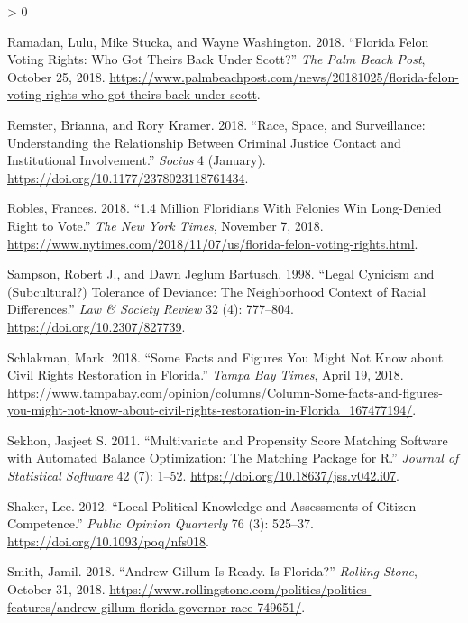 \documentclass[
  12pt,
]{article}
\newlength{\cslhangindent}
\newenvironment{CSLReferences}[2] %
 {%
  \setlength{\parindent}{0pt}
  \ifodd #1 \everypar{\setlength{\hangindent}{\cslhangindent}}\ignorespaces\fi
  \ifnum #2 > 0
  \setlength{\parskip}{#2\baselineskip}
  \fi
 }%
 {}
\begin{document}
\begin{CSLReferences}{1}{0}
\leavevmode\hypertarget{ref-Ramadan2018}{}%
Ramadan, Lulu, Mike Stucka, and Wayne Washington. 2018. {``Florida Felon Voting Rights: {Who} Got Theirs Back Under {Scott}?''} \emph{The Palm Beach Post}, October 25, 2018. \url{https://www.palmbeachpost.com/news/20181025/florida-felon-voting-rights-who-got-theirs-back-under-scott}.

\leavevmode\hypertarget{ref-Remster2018}{}%
Remster, Brianna, and Rory Kramer. 2018. {``Race, {Space}, and {Surveillance}: {Understanding} the {Relationship} Between {Criminal Justice Contact} and {Institutional Involvement}.''} \emph{Socius} 4 (January). \url{https://doi.org/10.1177/2378023118761434}.

\leavevmode\hypertarget{ref-Robles2018}{}%
Robles, Frances. 2018. {``1.4 {Million Floridians With Felonies Win Long}-{Denied Right} to {Vote}.''} \emph{The New York Times}, November 7, 2018. \url{https://www.nytimes.com/2018/11/07/us/florida-felon-voting-rights.html}.

\leavevmode\hypertarget{ref-Sampson1998}{}%
Sampson, Robert J., and Dawn Jeglum Bartusch. 1998. {``Legal {Cynicism} and ({Subcultural}?) {Tolerance} of {Deviance}: {The Neighborhood Context} of {Racial Differences}.''} \emph{Law \& Society Review} 32 (4): 777--804. \url{https://doi.org/10.2307/827739}.

\leavevmode\hypertarget{ref-Schlakman2018}{}%
Schlakman, Mark. 2018. {``Some Facts and Figures You Might Not Know about Civil Rights Restoration in {Florida}.''} \emph{Tampa Bay Times}, April 19, 2018. \url{https://www.tampabay.com/opinion/columns/Column-Some-facts-and-figures-you-might-not-know-about-civil-rights-restoration-in-Florida_167477194/}.

\leavevmode\hypertarget{ref-Sekhon2011}{}%
Sekhon, Jasjeet S. 2011. {``Multivariate and {Propensity Score Matching Software} with {Automated Balance Optimization}: {The Matching} Package for {R}.''} \emph{Journal of Statistical Software} 42 (7): 1--52. \url{https://doi.org/10.18637/jss.v042.i07}.

\leavevmode\hypertarget{ref-Shaker2012}{}%
Shaker, Lee. 2012. {``Local {Political Knowledge} and {Assessments} of {Citizen Competence}.''} \emph{Public Opinion Quarterly} 76 (3): 525--37. \url{https://doi.org/10.1093/poq/nfs018}.

\leavevmode\hypertarget{ref-Smith2018}{}%
Smith, Jamil. 2018. {``Andrew {Gillum Is Ready}. {Is Florida}?''} \emph{Rolling Stone}, October 31, 2018. \url{https://www.rollingstone.com/politics/politics-features/andrew-gillum-florida-governor-race-749651/}.


\end{CSLReferences}
\end{document}

